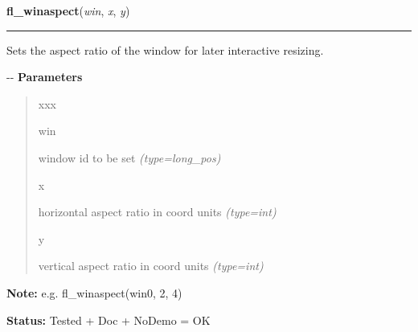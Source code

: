 \hspace{.8\funcindent}\begin{boxedminipage}{\funcwidth}

    \raggedright \textbf{fl\_winaspect}(\textit{win}, \textit{x}, \textit{y})

    \vspace{-1.5ex}

    \rule{\textwidth}{0.5\fboxrule}
\setlength{\parskip}{2ex}

Sets the aspect ratio of the window for later interactive resizing.

-{}-
\setlength{\parskip}{1ex}
      \textbf{Parameters}
      \vspace{-1ex}

      \begin{quote}
        \begin{Ventry}{xxx}

          \item[win]


window id to be set
            {\it (type=long\_pos)}

          \item[x]


horizontal aspect ratio in coord units
            {\it (type=int)}

          \item[y]


vertical aspect ratio in coord units
            {\it (type=int)}

        \end{Ventry}

      \end{quote}

\textbf{Note:} 
e.g. fl\_winaspect(win0, 2, 4)


\textbf{Status:} 
Tested + Doc + NoDemo = OK


    \end{boxedminipage}

    \label{xformslib:flxbasic:fl_reset_winconstraints}

    \vspace{0.5ex}

